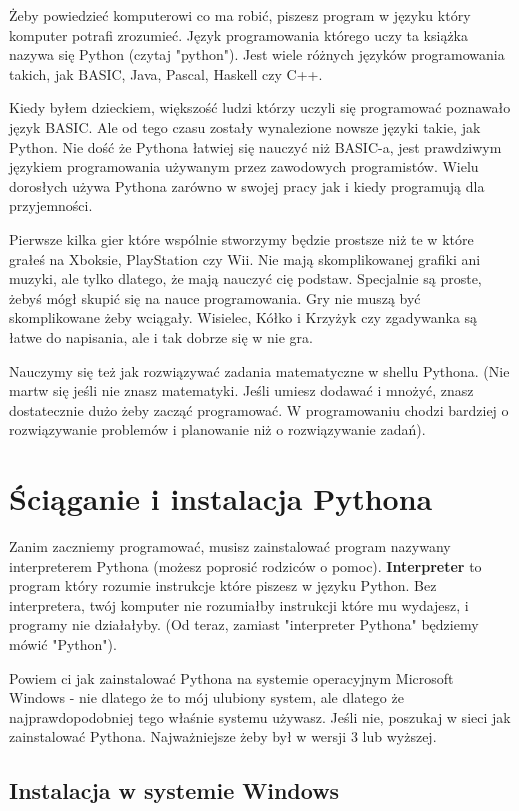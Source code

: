 \documentclass{book}
\begin{document}
Żeby powiedzieć komputerowi co ma robić, piszesz program w języku który komputer potrafi zrozumieć. Język programowania którego uczy ta książka nazywa się Python (czytaj "python"). Jest wiele różnych języków programowania takich, jak BASIC, Java, Pascal, Haskell czy C++.

Kiedy byłem dzieckiem, większość ludzi którzy uczyli się programować poznawało język BASIC. Ale od tego czasu zostały wynalezione nowsze języki takie, jak Python. Nie dość że Pythona łatwiej się nauczyć niż BASIC-a, jest prawdziwym językiem programowania używanym przez zawodowych programistów. Wielu dorosłych używa Pythona zarówno w swojej pracy jak i kiedy programują dla przyjemności.

Pierwsze kilka gier które wspólnie stworzymy będzie prostsze niż te w które grałeś na Xboksie, PlayStation czy Wii. Nie mają skomplikowanej grafiki ani muzyki, ale tylko dlatego, że mają nauczyć cię podstaw. Specjalnie są proste, żebyś mógł skupić się na nauce programowania. Gry nie muszą być skomplikowane żeby wciągały. Wisielec, Kółko i Krzyżyk czy zgadywanka są łatwe do napisania, ale i tak dobrze się w nie gra.

Nauczymy się też jak rozwiązywać zadania matematyczne w shellu Pythona. (Nie martw się jeśli nie znasz matematyki. Jeśli umiesz dodawać i mnożyć, znasz dostatecznie dużo żeby zacząć programować. W programowaniu chodzi bardziej o rozwiązywanie problemów i planowanie niż o rozwiązywanie zadań).

\section{Ściąganie i instalacja Pythona}

Zanim zaczniemy programować, musisz zainstalować program nazywany interpreterem Pythona (możesz poprosić rodziców o pomoc). {\bf Interpreter} to program który rozumie instrukcje które piszesz w języku Python. Bez interpretera, twój komputer nie rozumiałby instrukcji które mu wydajesz, i programy nie działałyby. (Od teraz, zamiast "interpreter Pythona" będziemy mówić "Python").

Powiem ci jak zainstalować Pythona na systemie operacyjnym Microsoft Windows - nie dlatego że to mój ulubiony system, ale dlatego że najprawdopodobniej tego właśnie systemu używasz. Jeśli nie, poszukaj w sieci jak zainstalować Pythona. Najważniejsze żeby był w wersji 3 lub wyższej.


\subsection{Instalacja w systemie Windows}
\end{document}
